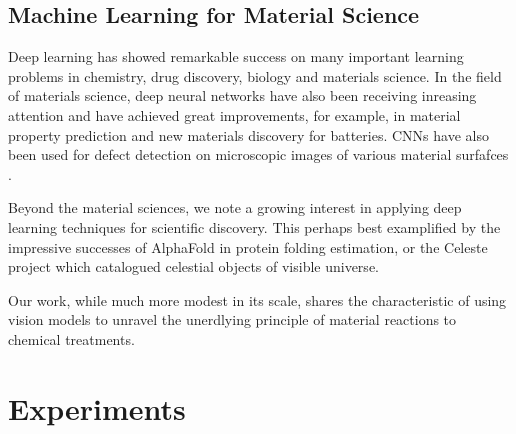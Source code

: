 \documentclass[10pt,twocolumn,letterpaper]{article}
\begin{document}
\subsection{Machine Learning for Material Science}
Deep learning has showed remarkable success on many important 
learning problems in chemistry, drug discovery, biology and materials science.
In the field of materials science, deep neural networks have also been receiving inreasing attention and have achieved great improvements, for example, in material property prediction and new materials discovery for batteries.
CNNs have also been used for defect detection on microscopic images of various material surfafces \cite{}.

Beyond the material sciences, we note a growing interest in applying deep learning techniques
for scientific discovery. 
This perhaps best examplified by the impressive successes of AlphaFold \cite{} in protein folding estimation,
or the Celeste \cite{} project which catalogued celestial objects of visible universe.

Our work, while much more modest in its scale, 
shares the characteristic of using vision models to unravel
the unerdlying principle of material reactions to chemical treatments.

\section{Experiments}
\end{document}
